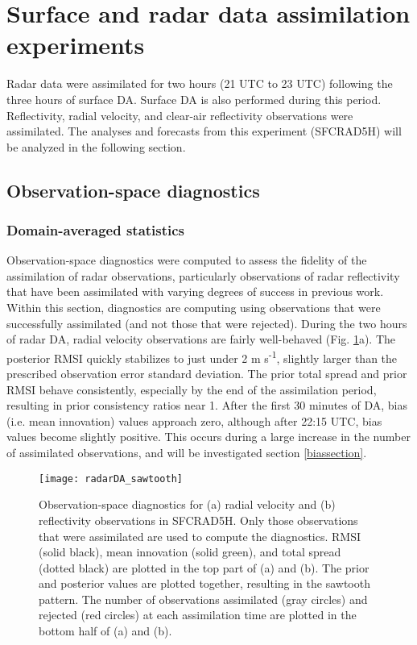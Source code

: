 \section{Surface and radar data assimilation experiments}
Radar data were assimilated for two hours (21 UTC to 23 UTC) following the three hours of surface DA. Surface DA is also performed during this period. Reflectivity, radial velocity, and clear-air reflectivity observations were assimilated. The analyses and forecasts from this experiment (SFCRAD5H) will be analyzed in the following section.
\subsection{Observation-space diagnostics}
\subsubsection{Domain-averaged statistics}
Observation-space diagnostics were computed to assess the fidelity of the assimilation of radar observations, particularly observations of radar reflectivity that have been assimilated with varying degrees of success in previous work. Within this section, diagnostics are computing using observations that were successfully assimilated (and not those that were rejected). During the two hours of radar DA, radial velocity observations are fairly well-behaved (Fig. \ref{sawtooth}a). The posterior RMSI quickly stabilizes to just under 2 m s\textsuperscript{-1}, slightly larger than the prescribed observation error standard deviation. The prior total spread and prior RMSI behave consistently, especially by the end of the assimilation period, resulting in prior consistency ratios near 1. After the first 30 minutes of DA, bias (i.e. mean innovation) values approach zero, although after 22:15 UTC, bias values become slightly positive. This occurs during a large increase in the number of assimilated observations, and will be investigated section \ref{biassection}.

\begin{figure}
\centering
\texttt{[image: radarDA\_sawtooth]}
\caption{Observation-space diagnostics for (a) radial velocity and (b) reflectivity observations in SFCRAD5H. Only those observations that were assimilated are used to compute the diagnostics. RMSI (solid black), mean innovation (solid green), and total spread (dotted black) are plotted in the top part of (a) and (b). The prior and posterior values are plotted together, resulting in the sawtooth pattern. The number of observations assimilated (gray circles) and rejected (red circles) at each assimilation time are plotted in the bottom half of (a) and (b).}
\label{sawtooth}
\end{figure}

